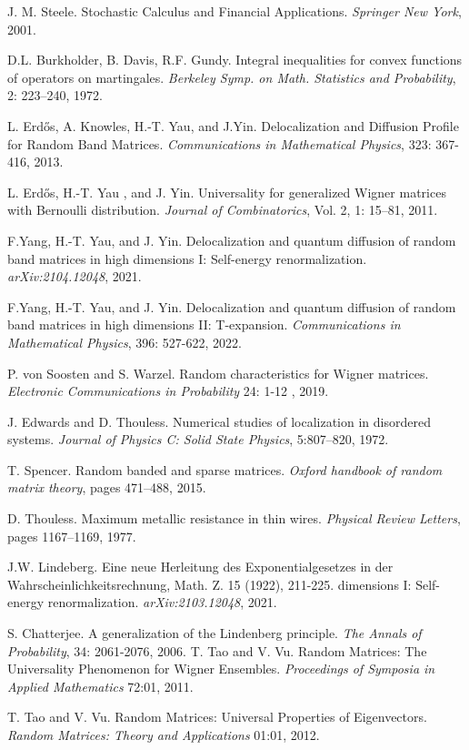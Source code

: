 \documentclass[11pt]{article}
\begin{document}
\begin{thebibliography}{99}
 J. M. Steele. Stochastic Calculus and Financial Applications.\textit{ Springer New York}, 2001.

 D.L. Burkholder, B. Davis, R.F. Gundy. Integral inequalities for convex functions of operators on martingales. \textit{Berkeley Symp. on Math. Statistics and Probability}, 2: 223–240, 1972.

 L. Erdős, A. Knowles, H.-T. Yau, and J.Yin. Delocalization and Diffusion Profile for Random Band Matrices. \textit{Communications in Mathematical Physics}, 323: 367-416, 2013.

 L. Erdős, H.-T. Yau , and J. Yin. Universality for generalized Wigner matrices with Bernoulli distribution. \textit{Journal of Combinatorics}, Vol. 2, 1: 15–81, 2011.

 F.Yang, H.-T. Yau, and J. Yin. Delocalization and quantum diffusion of random band matrices in high dimensions I: Self-energy renormalization. \textit{arXiv:2104.12048}, 2021.

 F.Yang, H.-T. Yau, and J. Yin. Delocalization and quantum diffusion of random band matrices in high dimensions II: T-expansion. \textit{Communications in Mathematical Physics}, 396: 527-622, 2022.

 P. von Soosten and S. Warzel. Random characteristics for Wigner matrices.  \textit{Electronic Communications in Probability} 24: 1-12 , 2019.

 J. Edwards and D. Thouless. Numerical studies of localization in disordered systems. \textit{Journal of Physics
C: Solid State Physics}, 5:807–820, 1972.

 T. Spencer. Random banded and sparse matrices. \textit{Oxford handbook of random matrix theory}, pages
471–488, 2015.

 D. Thouless. Maximum metallic resistance in thin wires. \textit{Physical Review Letters}, pages 1167–1169,
1977.


 J.W. Lindeberg. Eine neue Herleitung des Exponentialgesetzes in der Wahrscheinlichkeitsrechnung, Math. Z. 15 (1922), 211-225. 
dimensions I: Self-energy renormalization. \textit{arXiv:2103.12048}, 2021.

 S. Chatterjee. A generalization of the Lindenberg principle. \textit{The Annals of Probability}, 34: 2061-2076, 2006.
 T. Tao and V. Vu. Random Matrices: The Universality Phenomenon for Wigner Ensembles. \textit{ Proceedings of Symposia in Applied Mathematics} 72:01, 2011.

 T. Tao and V. Vu. Random Matrices: Universal Properties of Eigenvectors. \textit{Random Matrices: Theory and Applications} 01:01, 2012.



\end{thebibliography}
\end{document}
